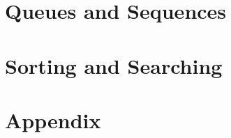 \documentclass[a4paper,twoside]{book} %
\begin{document}





\part{Queues and Sequences}




\part{Sorting and Searching}




\part{Appendix}
\appendix
\noappendicestocpagenum
\addappheadtotoc





\printindex
\end{document}
